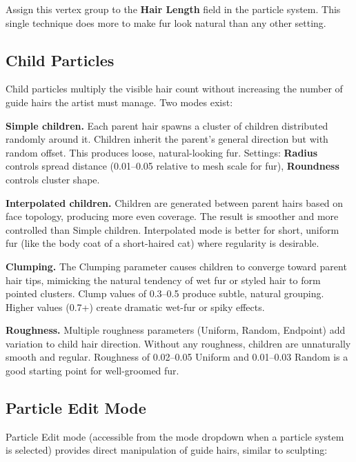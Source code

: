 Assign this vertex group to the \textbf{Hair Length} field in the particle system. This single technique does more to make fur look natural than any other setting.


\subsection{Child Particles}

Child particles multiply the visible hair count without increasing the number of guide hairs the artist must manage. Two modes exist:

\textbf{Simple children.} Each parent hair spawns a cluster of children distributed randomly around it. Children inherit the parent's general direction but with random offset. This produces loose, natural-looking fur. Settings: \textbf{Radius} controls spread distance (0.01--0.05 relative to mesh scale for fur), \textbf{Roundness} controls cluster shape.

\textbf{Interpolated children.} Children are generated between parent hairs based on face topology, producing more even coverage. The result is smoother and more controlled than Simple children. Interpolated mode is better for short, uniform fur (like the body coat of a short-haired cat) where regularity is desirable.

\textbf{Clumping.} The Clumping parameter causes children to converge toward parent hair tips, mimicking the natural tendency of wet fur or styled hair to form pointed clusters. Clump values of 0.3--0.5 produce subtle, natural grouping. Higher values (0.7+) create dramatic wet-fur or spiky effects.

\textbf{Roughness.} Multiple roughness parameters (Uniform, Random, Endpoint) add variation to child hair direction. Without any roughness, children are unnaturally smooth and regular. Roughness of 0.02--0.05 Uniform and 0.01--0.03 Random is a good starting point for well-groomed fur.


\subsection{Particle Edit Mode}

Particle Edit mode (accessible from the mode dropdown when a particle system is selected) provides direct manipulation of guide hairs, similar to sculpting:

